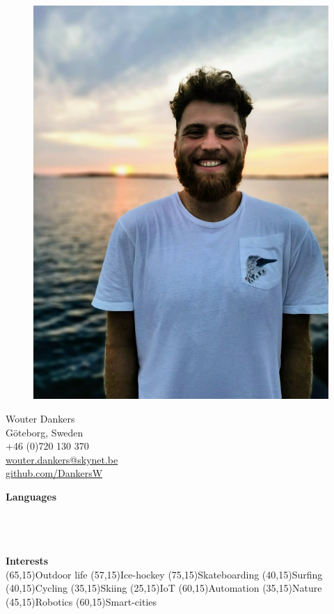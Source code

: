 \documentclass[a4paper,12pt,final]{memoir}
\begin{document}
%
\begin{figure}
	\hfill
	\includegraphics[width=1\columnwidth]{img/profile_pic.jpg}
	\vspace{-3.5cm}
\end{figure}

\begin{flushright}\small
	Wouter Dankers \\
	G\"oteborg, Sweden \\
	+46 (0)720 130 370 \\
	\url{wouter.dankers@skynet.be}  \\
	\url{github.com/DankersW} \\
	\Sep
	
	{\Large\textbf{Languages}}
	 \\
     \\
     \\
     \\
	\Sep
	\Sep
	
    {\Large\textbf{Interests}}\\
	\SmallSep
    \framebox(65,15){Outdoor life} \framebox(57,15){Ice-hockey} \framebox(75,15){Skateboarding} \framebox(40,15){Surfing} \framebox(40,15){Cycling} \framebox(35,15){Skiing} \framebox(25,15){IoT} \framebox(60,15){Automation} \framebox(35,15){Nature} \framebox(45,15){Robotics} \framebox(60,15){Smart-cities} \\
    \Sep

    
\end{flushright}\normalsize
\framebreak
\end{document}
